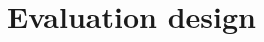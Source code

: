 \documentclass[pdflatex,sn-mathphys-num]{sn-jnl}
\makeatletter
\theoremstyle{thmstyletwo}%
\theoremstyle{thmstylethree}%
\newcommand{\code}[1]{\texttt{#1}}
\renewcommand\paragraph{\@startsection{paragraph}{4}{\z@}%
  {6pt \@plus 2pt \@minus 1pt}{-0.6em}{\normalfont\normalsize\bfseries}}
\makeatother
\begin{document}


\section{Evaluation design}\label{sec:design}
\end{document}

